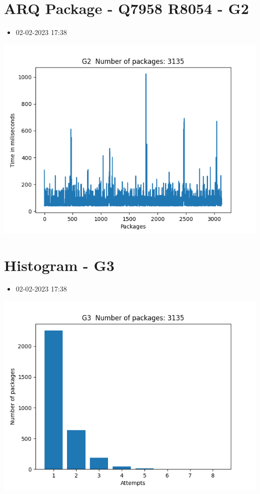 \documentclass[10pt,a4paper]{article}
\begin{document}
\section*{\textlatin{ARQ Package - Q7958 R8054 - G2}}
\begin{itemize}
  \item 02-02-2023 17:38
\end{itemize}
\begin{center}
  \includegraphics[scale=0.8]{G2.png}
\end{center}

\section*{\textlatin{Histogram - G3}}
\begin{itemize}
  \item 02-02-2023 17:38
\end{itemize}
\begin{center}
  \includegraphics[scale=0.8]{G3.png}
\end{center}
\end{document}
